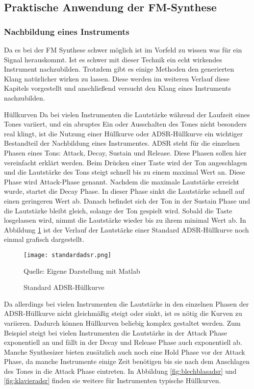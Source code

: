 \subsection{Praktische Anwendung der FM-Synthese}
\subsubsection{Nachbildung eines Instruments}
Da es bei der FM Synthese schwer möglich ist im Vorfeld zu wissen was für ein Signal herauskommt. Ist es schwer mit dieser Technik ein echt wirkendes Instrument nachzubilden.
Trotzdem gibt es einige Methoden den generierten Klang natürlicher wirken zu lassen. Diese werden im weiteren Verlauf diese Kapitels vorgestellt und anschließend versucht den Klang eines Instruments nachzubilden.

Hüllkurven
Da bei vielen Instrumenten die Lautstärke während der Laufzeit eines Tones variiert, und ein abruptes Ein oder Ausschalten des Tones nicht besonders real klingt, ist die Nutzung einer Hüllkurve oder ADSR-Hüllkurve ein wichtiger Bestandteil der Nachbildung eines Instrumentes. ADSR steht für die einzelnen Phasen eines Tons: Attack, Decay, Sustain und Release. Diese Phasen sollen hier vereinfacht erklärt werden. Beim Drücken einer Taste wird der Ton angeschlagen und die Lautstärke des Tons steigt schnell bis zu einem maximal Wert an. Diese Phase wird Attack-Phase genannt. Nachdem die maximale Lautstärke erreicht wurde, startet die Decay Phase. In dieser Phase sinkt die Lautstärke schnell auf einen geringeren Wert ab. Danach befindet sich der Ton in der Sustain Phase und die Lautstärke bleibt gleich, solange der Ton gespielt wird. Sobald die Taste losgelassen wird, nimmt die Lautstärke wieder bis zu ihrem minimal Wert ab. In Abbildung \ref{fig:defaultADSR} ist der Verlauf der Lautstärke einer Standard ADSR-Hüllkurve noch einmal grafisch dargestellt.

\begin{figure} [ht]
\centering
  \texttt{[image: standardadsr.png]}
\caption{Standard ADSR-Hüllkurve}
\label{fig:defaultADSR}
Quelle: Eigene Darstellung mit Matlab
\end{figure}



Da allerdings bei vielen Instrumenten die Lautstärke in den einzelnen Phasen der ADSR-Hüllkurve nicht gleichmäßig steigt oder sinkt, ist es nötig die Kurven zu variieren. Dadurch können Hüllkurven beliebig komplex gestaltet werden. Zum Beispiel steigt bei vielen Instrumenten die Lautstärke in der Attack Phase exponentiell an und fällt in der Decay und Release Phase auch exponentiell ab. Manche Synthesizer bieten zusätzlich auch noch eine Hold Phase vor der Attack Phase, da manche Instrumente einige Zeit benötigen bis sie nach dem Anschlagen des Tones in die Attack Phase eintreten. In Abbildung \ref{fig:blechblasadsr} und \ref{fig:klavieradsr} finden sie weitere für Instrumenten typische Hüllkurven.

